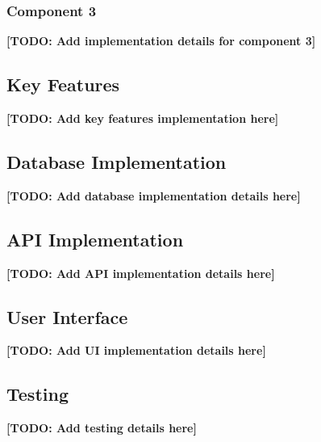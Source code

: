 \subsubsection{Component 3}
\textbf{[TODO: Add implementation details for component 3]}

\subsection{Key Features}


\textbf{[TODO: Add key features implementation here]}

\subsection{Database Implementation}


\textbf{[TODO: Add database implementation details here]}

\subsection{API Implementation}


\textbf{[TODO: Add API implementation details here]}

\subsection{User Interface}


\textbf{[TODO: Add UI implementation details here]}

\subsection{Testing}


\textbf{[TODO: Add testing details here]}

